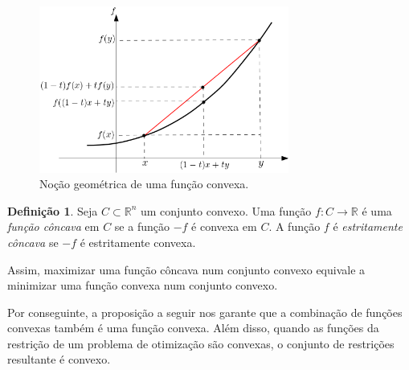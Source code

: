 \documentclass[12pt,a4paper]{scrartcl}
\def\RR{\mathds{R}}
\theoremstyle{definition}%
\newtheorem{defi}{Definição}
\begin{document}
\begin{figure}[!ht] 
	\centering
	\includegraphics[width=0.73\textwidth]{nocao_geometrica_funcao_convexa}
	\caption{Noção geométrica de uma função convexa. \label{fig:nocao_funcao_convexa}}
\end{figure}

\begin{defi}
Seja $C \subset \RR^{n}$ um conjunto convexo. Uma função $f: C \rightarrow \RR $ é uma \emph{função côncava} em $C$ se a função $-f$ é convexa em $C$. A função $f$ é \emph{estritamente côncava} se $-f$ é estritamente convexa.
\end{defi}

Assim, maximizar uma função côncava num conjunto convexo equivale a minimizar uma função convexa num conjunto convexo.

Por conseguinte, a proposição a seguir nos garante que a combinação de funções convexas também é uma função convexa. Além disso, quando as funções da restrição de um problema de otimização são convexas, o conjunto de restrições resultante é convexo.
\end{document}
